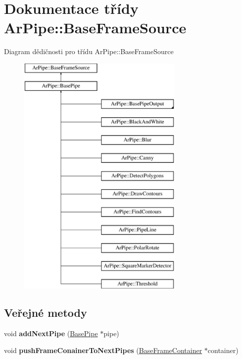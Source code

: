 \hypertarget{class_ar_pipe_1_1_base_frame_source}{\section{Dokumentace třídy Ar\-Pipe\-:\-:Base\-Frame\-Source}
\label{d6/d97/class_ar_pipe_1_1_base_frame_source}
}
Diagram dědičnosti pro třídu Ar\-Pipe\-:\-:Base\-Frame\-Source\begin{figure}[H]
\begin{center}
\leavevmode
\includegraphics[height=12.000000cm]{d6/d97/class_ar_pipe_1_1_base_frame_source}
\end{center}
\end{figure}
\subsection*{Veřejné metody}
\begin{DoxyCompactItemize}
\item 
\hypertarget{class_ar_pipe_1_1_base_frame_source_a7930cb5e6a1a2bffd9217394e7f4faf4}{void {\bfseries add\-Next\-Pipe} (\hyperlink{class_ar_pipe_1_1_base_pipe}{Base\-Pipe} $\ast$pipe)}\label{d6/d97/class_ar_pipe_1_1_base_frame_source_a7930cb5e6a1a2bffd9217394e7f4faf4}

\item 
\hypertarget{class_ar_pipe_1_1_base_frame_source_a061c93c08b081c41f6a4845f20149e1a}{void {\bfseries push\-Frame\-Conainer\-To\-Next\-Pipes} (\hyperlink{class_ar_pipe_1_1_base_frame_container}{Base\-Frame\-Container} $\ast$container)}\label{d6/d97/class_ar_pipe_1_1_base_frame_source_a061c93c08b081c41f6a4845f20149e1a}

\end{DoxyCompactItemize}
